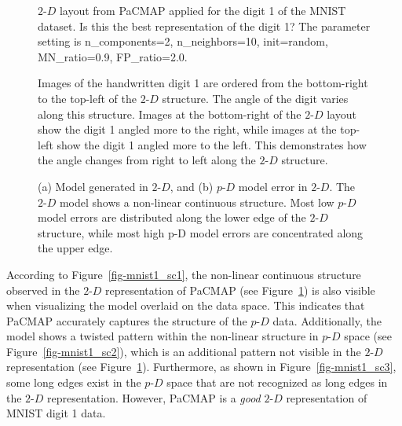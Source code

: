 \documentclass[
  12pt]{article}
\newcommand\pD{$p\text{-}D$}
\newcommand\gD{$2\text{-}D$}
\begin{document}
\begin{figure}[H]


\caption{\label{fig-pacmap-author}\(2\text{-}D\) layout from PaCMAP
applied for the digit 1 of the MNIST dataset. Is this the best
representation of the digit 1? The parameter setting is n\_components=2,
n\_neighbors=10, init=random, MN\_ratio=0.9, FP\_ratio=2.0.}

\end{figure}%

\begin{figure}[H]


\caption{\label{fig-pacmap-author-img}Images of the handwritten digit 1
are ordered from the bottom-right to the top-left of the \(2\text{-}D\)
structure. The angle of the digit varies along this structure. Images at
the bottom-right of the \(2\text{-}D\) layout show the digit 1 angled
more to the right, while images at the top-left show the digit 1 angled
more to the left. This demonstrates how the angle changes from right to
left along the \(2\text{-}D\) structure.}

\end{figure}%

\begin{figure}[H]


\caption{\label{fig-model-mnist}(a) Model generated in \(2\text{-}D\),
and (b) \(p\text{-}D\) model error in \(2\text{-}D\). The \(2\text{-}D\)
model shows a non-linear continuous structure. Most low \(p\text{-}D\)
model errors are distributed along the lower edge of the \(2\text{-}D\)
structure, while most high p-D model errors are concentrated along the
upper edge.}

\end{figure}%

According to Figure~\ref{fig-mnist1_sc1}, the non-linear continuous
structure observed in the \gD{} representation of PaCMAP (see
Figure~\ref{fig-pacmap-author}) is also visible when visualizing the
model overlaid on the data space. This indicates that PaCMAP accurately
captures the structure of the \pD{} data. Additionally, the model shows
a twisted pattern within the non-linear structure in \pD{} space (see
Figure~\ref{fig-mnist1_sc2}), which is an additional pattern not visible
in the \gD{} representation (see Figure~\ref{fig-pacmap-author}).
Furthermore, as shown in Figure~\ref{fig-mnist1_sc3}, some long edges
exist in the \pD{} space that are not recognized as long edges in the
\gD{} representation. However, PaCMAP is a \emph{good} \gD{}
representation of MNIST digit 1 data.
\end{document}

